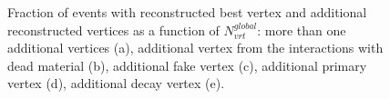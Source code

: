 \begin{figure}[H]
{			\begin{subfigure}[b]{\linewidth}{
					}
			\end{subfigure}
		}
	\caption[Fraction of events with reconstructed best vertex and additional reconstructed vertices  as a function of $N_{vrt}^{global}$]{Fraction of events with reconstructed best vertex and additional reconstructed vertices as a function of $N_{vrt}^{global}$: more than one additional vertices (a), additional vertex from the interactions with dead material (b), additional fake vertex (c), additional primary vertex (d), additional decay vertex (e).}
	\label{fig:vertexAdditional}
\end{figure}

